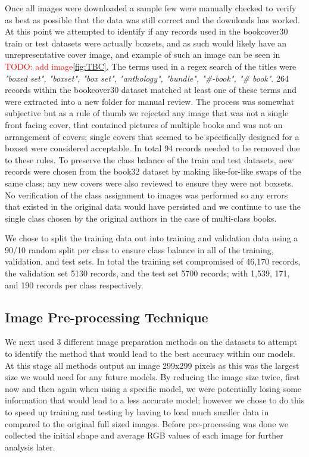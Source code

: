 \documentclass[12pt]{article}
\numberwithin{equation}{section}
\numberwithin{figure}{section}
\begin{document}
Once all images were downloaded a sample few were manually checked to verify as best as possible that the data was still correct and the downloads has worked. At this point we attempted to identify if any records used in the bookcover30 train or test datasets were actually boxsets, and as such would likely have an unrepresentative cover image, and example of such an image can be seen in \textcolor{red}{TODO: add image}\cref{fig:TBC}. The terms used in a regex search of the titles were \emph{"boxed set", "boxset", "box set", "anthology", "bundle", "\#-book", "\# book"}. 264 records within the bookcover30 dataset matched at least one of these terms and were extracted into a new folder for manual review. The process was somewhat subjective but as a rule of thumb we rejected any image that was not a single front facing cover, that contained pictures of multiple books and was not an arrangement of covers; single covers that seemed to be specifically designed for a boxset were considered acceptable. In total 94 records needed to be removed due to these rules. To preserve the class balance of the train and test datasets, new records were chosen from the book32 dataset by making like-for-like swaps of the same class; any new covers were also reviewed to ensure they were not boxsets. No verification of the class assignment to images was performed so any errors that existed in the original data would have persisted and we continue to use the single class chosen by the original authors in the case of multi-class books.

We chose to split the training data out into training and validation data using a 90/10 random split per class to ensure class balance in all of the training, validation, and test sets. In total the training set compromised of 46,170 records, the validation set 5130 records, and 
the test set 5700 records; with 1,539, 171, and 190 records per class respectively. 

\subsection{Image Pre-processing Technique} 
\label{sub:Image_Pre-processing_Technique} 

We next used 3 different image preparation methods on the datasets to attempt to identify the method that would lead to the best accuracy within our models. At this stage all methods output an image 299x299 pixels as this was the largest size we would need for any future models. By reducing the image size twice, first now and then again when using a specific model, we were potentially losing some information that would lead to a less accurate model; however we chose to do this to speed up training and testing by having to load much smaller data in compared to the original full sized images. Before pre-processing was done we collected the initial shape and average RGB values of each image for further analysis later.
\end{document}
